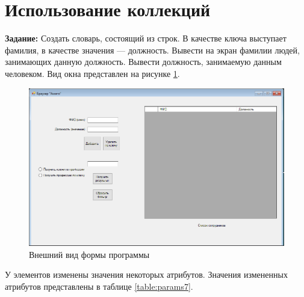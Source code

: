 \section{Использование коллекций}

\textbf{Задание:} Создать словарь, состоящий из строк. В качестве ключа выступает фамилия, в качестве значения — должность. Вывести на экран фамилии людей, занимающих данную должность. 
Вывести должность, занимаемую данным человеком.
Вид окна представлен на рисунке \ref{fig:task7_form}.
\begin{figure}[H]
    \centering
    \includegraphics[scale=0.7]{task7/form.png}
    \caption{Внешний вид формы программы}
    \label{fig:task7_form}
\end{figure}
У элементов изменены значения некоторых атрибутов. 
Значения измененных атрибутов представлены в таблице \ref{table:params7}.
